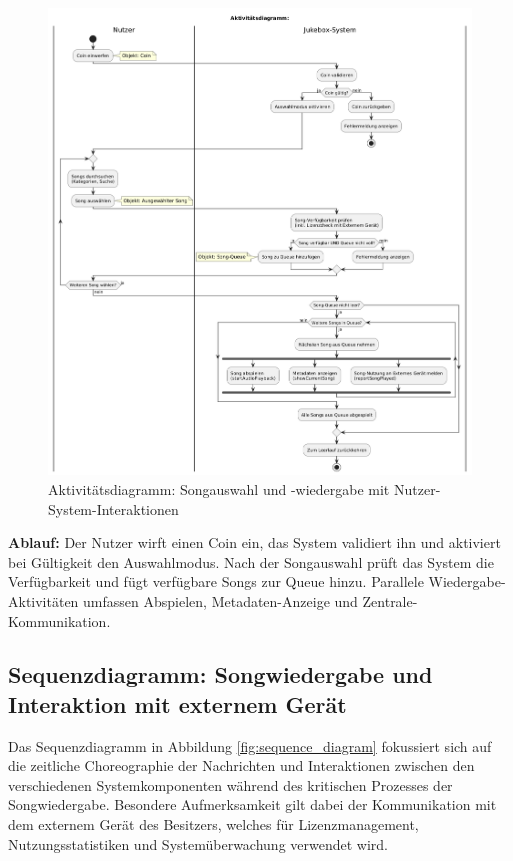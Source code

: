 \documentclass[12pt,oneside]{article}
\begin{document}
\begin{figure}[H]
    \centering
    \includegraphics[width=\textwidth]{images/activity_diagram.png}
    \caption{Aktivitätsdiagramm: Songauswahl und -wiedergabe mit Nutzer-System-Interaktionen}
    \label{fig:activity_diagram}
\end{figure}
\noindent
\textbf{Ablauf:} Der Nutzer wirft einen Coin ein, das System validiert ihn und aktiviert bei Gültigkeit den Auswahlmodus. Nach der Songauswahl prüft das System die Verfügbarkeit und fügt verfügbare Songs zur Queue hinzu. Parallele Wiedergabe-Aktivitäten umfassen Abspielen, Metadaten-Anzeige und Zentrale-Kommunikation.

\subsection{Sequenzdiagramm: Songwiedergabe und Interaktion mit externem Gerät}
Das Sequenzdiagramm in Abbildung \ref{fig:sequence_diagram} fokussiert sich auf die zeitliche Choreographie der Nachrichten und Interaktionen zwischen den verschiedenen Systemkomponenten während des kritischen Prozesses der Songwiedergabe. Besondere Aufmerksamkeit gilt dabei der Kommunikation mit dem externem Gerät des Besitzers, welches für Lizenzmanagement, Nutzungsstatistiken und Systemüberwachung verwendet wird.
\end{document}
